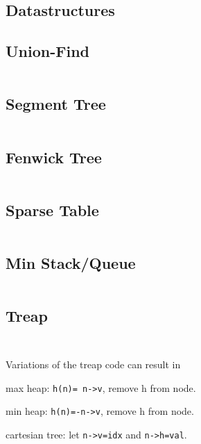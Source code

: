 \documentclass[8pt,a4paper,landscape,oneside]{amsart}
\newenvironment{itemize_compact}
{ \begin{itemize}[leftmargin=.5cm]
    \setlength{\itemsep}{0pt}
    \setlength{\parskip}{0pt}
    \setlength{\parsep}{0pt}     }
{ \end{itemize}                  }
\begin{document}
\begin{multicols*}{2}
		\section{Datastructures}
	\begin{multicols*}{2}		
		\subsection{Union-Find}
		\inputminted[firstline=9,lastline=19]{c++}{_code/datastructures/union_find.cpp}
		\subsection{Segment Tree}
		\inputminted[firstline=14,lastline=52]{c++}{_code/datastructures/segment_tree.cpp}
		\vfill\null
		\columnbreak
		\subsection{Fenwick Tree}
		\inputminted[firstline=14,lastline=32]{c++}{_code/datastructures/fenwick_tree.cpp}
		\subsection{Sparse Table}
		\inputminted[firstline=15,lastline=23]{c++}{_code/datastructures/sparse_table.cpp}
		\subsection{Min Stack/Queue}
		\inputminted[firstline=15,lastline=35]{c++}{_code/datastructures/min_queue.cpp}
		\vfill\null
	\end{multicols*}
	\begin{multicols*}{2}
		\subsection{Treap}
		\inputminted[firstline=16,lastline=67]{c++}{_code/datastructures/treap.cpp}
		\vfill\null
		\columnbreak
		\inputminted[firstline=68,lastline=115]{c++}{_code/datastructures/treap.cpp}
		\noindent
		Variations of the treap code can result in
		\begin{itemize_compact}
			\item max heap: \texttt{h(n)= n->v}, remove h from node.
			\item min heap: \texttt{h(n)=-n->v}, remove h from node.
			\item cartesian tree: let \texttt{n->v=idx} and \texttt{n->h=val}.
		\end{itemize_compact}
		\vfill\null
	\end{multicols*}
	\newpage
	\begin{multicols*}{2}

\end{multicols*}
\end{multicols*}
\end{document}
